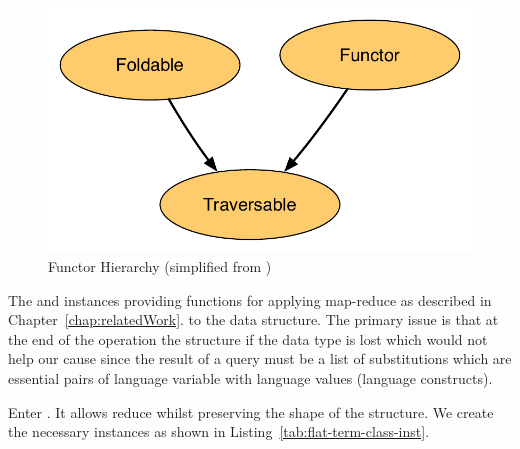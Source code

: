 \documentclass[thesis-solanki.tex]{subfiles}
\begin{document}
\begin{figure}[th]
\centering
\includegraphics[scale = 0.7]{FunctorHierarchy.pdf}
\caption{Functor Hierarchy (simplified from \cite{website:foldablenadtraversable})}
\label{fig:Functor Hierarchy}
\end{figure}

The  and  instances providing functions for applying map-reduce as described in Chapter~\ref{chap:relatedWork}.
to the data structure.
The primary issue is that at the end of the operation the structure if the data type is lost which would not help
our cause since the result of a query must be a list of substitutions which are essential pairs of language
variable with language values (language constructs).

Enter .
It allows reduce whilst preserving the shape of the structure.
We create the necessary instances
as shown in Listing~\ref{tab:flat-term-class-inst}.
\begin{code-list}[H]
  \begin{singlespace}
    \inputminted[linenos,lastline=12]{haskell}{haskell-proto1-class-flat.hs}
  \end{singlespace}
  \caption{\protect{} class instances}
  \label{tab:flat-term-class-inst}
\end{code-list}
\end{document}
